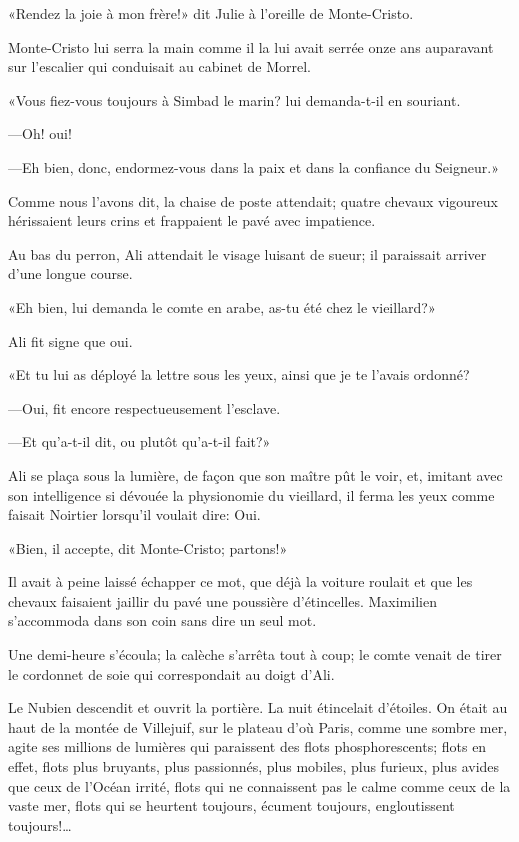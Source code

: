 «Rendez la joie à mon frère!» dit Julie à l'oreille de Monte-Cristo. 

Monte-Cristo lui serra la main comme il la lui avait serrée onze ans auparavant sur l'escalier qui conduisait au cabinet de Morrel. 

«Vous fiez-vous toujours à Simbad le marin? lui demanda-t-il en souriant. 

—Oh! oui! 

—Eh bien, donc, endormez-vous dans la paix et dans la confiance du Seigneur.» 

Comme nous l'avons dit, la chaise de poste attendait; quatre chevaux vigoureux hérissaient leurs crins et frappaient le pavé avec impatience. 

Au bas du perron, Ali attendait le visage luisant de sueur; il paraissait arriver d'une longue course. 

«Eh bien, lui demanda le comte en arabe, as-tu été chez le vieillard?» 

Ali fit signe que oui. 

«Et tu lui as déployé la lettre sous les yeux, ainsi que je te l'avais ordonné? 

—Oui, fit encore respectueusement l'esclave. 

—Et qu'a-t-il dit, ou plutôt qu'a-t-il fait?» 

Ali se plaça sous la lumière, de façon que son maître pût le voir, et, imitant avec son intelligence si dévouée la physionomie du vieillard, il ferma les yeux comme faisait Noirtier lorsqu'il voulait dire: Oui. 

«Bien, il accepte, dit Monte-Cristo; partons!» 

Il avait à peine laissé échapper ce mot, que déjà la voiture roulait et que les chevaux faisaient jaillir du pavé une poussière d'étincelles. Maximilien s'accommoda dans son coin sans dire un seul mot. 

Une demi-heure s'écoula; la calèche s'arrêta tout à coup; le comte venait de tirer le cordonnet de soie qui correspondait au doigt d'Ali. 

Le Nubien descendit et ouvrit la portière. La nuit étincelait d'étoiles. On était au haut de la montée de Villejuif, sur le plateau d'où Paris, comme une sombre mer, agite ses millions de lumières qui paraissent des flots phosphorescents; flots en effet, flots plus bruyants, plus passionnés, plus mobiles, plus furieux, plus avides que ceux de l'Océan irrité, flots qui ne connaissent pas le calme comme ceux de la vaste mer, flots qui se heurtent toujours, écument toujours, engloutissent toujours!\dots 

